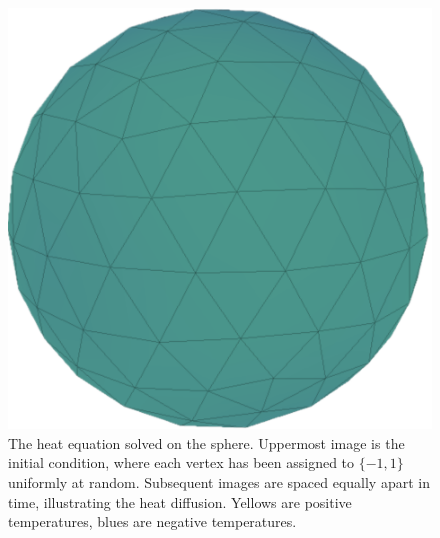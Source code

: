 \begin{figure}
    \includegraphics[width=0.9\columnwidth]{../images/sphere_cooled.png}\vspace*{3mm}
    \caption{The heat equation solved on the sphere. Uppermost image is the initial condition, where each vertex has been assigned to $\{-1, 1\}$ uniformly at random. Subsequent images are spaced equally apart in time, illustrating the heat diffusion. Yellows are positive temperatures, blues are negative temperatures.}
    \label{fig:heat_solution}
\end{figure}

